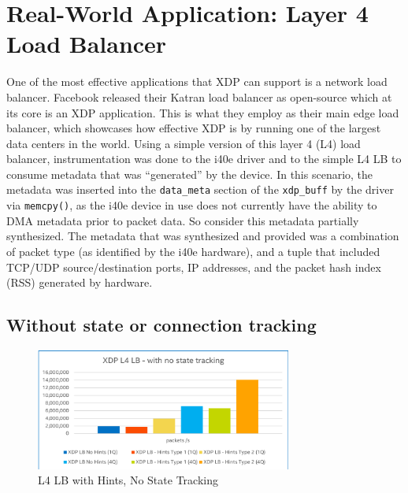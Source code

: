 \documentclass[letterpaper]{article}
\begin{document}
\section{Real-World Application: Layer 4 Load Balancer}
One of the most effective applications that XDP can support is a network load balancer.  Facebook released their Katran load balancer as open-source \cite{katran-2018} which at its core is an XDP application.  This is what they employ as their main edge load balancer, which showcases how effective XDP is by running one of the largest data centers in the world.
\newline
\newline
Using a simple version of this layer 4 (L4) load balancer, instrumentation was done to the i40e driver \cite{xdp-patches-2018} and to the simple L4 LB to consume metadata that was “generated” by the device.  In this scenario, the metadata was inserted into the {\small \texttt{data\_meta}} section of the {\small \texttt{xdp\_buff}} by the driver via {\small \texttt{memcpy()}}, as the i40e device in use does not currently have the ability to DMA metadata prior to packet data.  So consider this metadata partially synthesized.
\newline
\newline
The metadata that was synthesized and provided was a combination of packet type (as identified by the i40e hardware), and a tuple that included TCP/UDP source/destination ports, IP addresses, and the packet hash index (RSS) generated by hardware.

\subsection{Without state or connection tracking}

\begin{figure}[h]
\includegraphics[width=3.31in]{l4-perf-no-tracking.png}
\caption{L4 LB with Hints, No State Tracking}
\label{l4-perf-no-tracking}
\end{figure}
\end{document}
